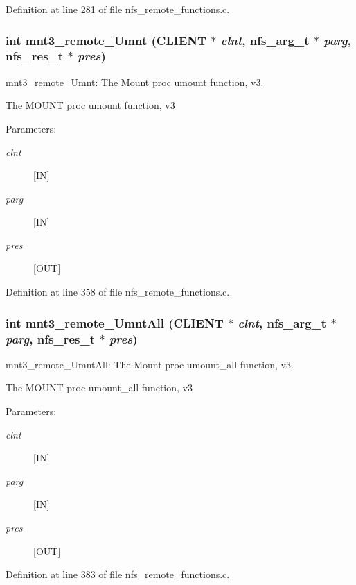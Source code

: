 Definition at line 281 of file nfs\_\-remote\_\-functions.c.
\subsubsection[{mnt3\_\-remote\_\-Umnt}]{\setlength{\rightskip}{0pt plus 5cm}int mnt3\_\-remote\_\-Umnt (CLIENT $\ast$ {\em clnt}, \/  nfs\_\-arg\_\-t $\ast$ {\em parg}, \/  nfs\_\-res\_\-t $\ast$ {\em pres})}\label{group__MNTprocs_g0eb4ed1fa7c89a3d21b91325082706a9}


mnt3\_\-remote\_\-Umnt: The Mount proc umount function, v3.

The MOUNT proc umount function, v3

\begin{Desc}
\item[Parameters:]
\begin{description}
\item[{\em clnt}][IN] \item[{\em parg}][IN] \item[{\em pres}][OUT] \end{description}
\end{Desc}


Definition at line 358 of file nfs\_\-remote\_\-functions.c.
\subsubsection[{mnt3\_\-remote\_\-UmntAll}]{\setlength{\rightskip}{0pt plus 5cm}int mnt3\_\-remote\_\-UmntAll (CLIENT $\ast$ {\em clnt}, \/  nfs\_\-arg\_\-t $\ast$ {\em parg}, \/  nfs\_\-res\_\-t $\ast$ {\em pres})}\label{group__MNTprocs_g72108294349dc32d7ae07d0d88e4d154}


mnt3\_\-remote\_\-UmntAll: The Mount proc umount\_\-all function, v3.

The MOUNT proc umount\_\-all function, v3

\begin{Desc}
\item[Parameters:]
\begin{description}
\item[{\em clnt}][IN] \item[{\em parg}][IN] \item[{\em pres}][OUT] \end{description}
\end{Desc}


Definition at line 383 of file nfs\_\-remote\_\-functions.c.